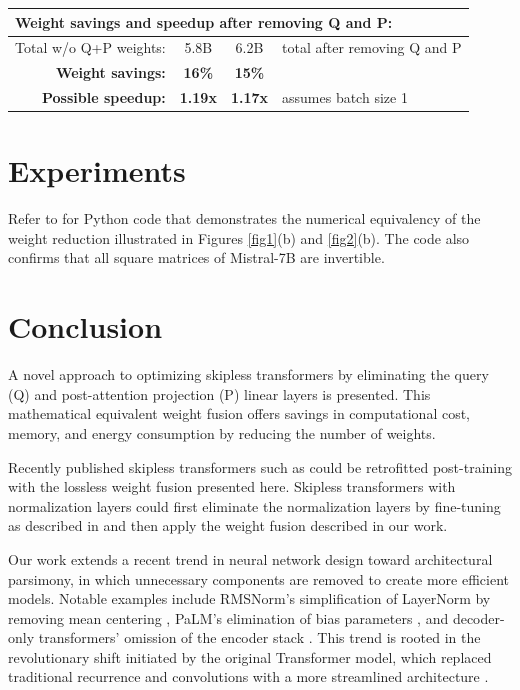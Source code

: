 \documentclass{article}
\begin{document}
\begin{center}
\begin{tabular}{lccl}
  \multicolumn{4}{l}{\textbf{Weight savings and speedup after removing Q and P:}}                           \\ \hline
  Total w/o Q+P weights:                           & 5.8B           & 6.2B   & total after removing Q and P \\
  \multicolumn{1}{r}{\textbf{Weight savings:}}     & \textbf{16\%}  & \textbf{15\%}  &                      \\
  \multicolumn{1}{r}{\textbf{Possible speedup:}}   & \textbf{1.19x} & \textbf{1.17x} & assumes batch size 1 \\ \hline
\end{tabular} \end{center}
\endgroup

\section{Experiments}
Refer to \cite{tricks} for Python code that demonstrates the numerical equivalency of the weight reduction illustrated in Figures \ref{fig1}(b) and \ref{fig2}(b). The code also confirms that all square matrices of Mistral-7B are invertible.

\section{Conclusion}
A novel approach to optimizing skipless transformers by eliminating the query (Q) and post-attention projection (P) linear layers is presented. This mathematical equivalent weight fusion offers savings in computational cost, memory, and energy consumption by reducing the number of weights.

Recently published skipless transformers such as \cite{skipless2, skipless} could be retrofitted post-training with the lossless weight fusion presented here. Skipless transformers with normalization layers could first eliminate the normalization layers by fine-tuning as described in \cite{remove-norm, remove-norm2} and then apply the weight fusion described in our work.

Our work extends a recent trend in neural network design toward architectural parsimony, in which unnecessary components are removed to create more efficient models. Notable examples include RMSNorm’s simplification of LayerNorm by removing mean centering \cite{rms}, PaLM’s elimination of bias parameters \cite{PaLM}, and decoder-only transformers’ omission of the encoder stack \cite{genWiki}. This trend is rooted in the revolutionary shift initiated by the original Transformer model, which replaced traditional recurrence and convolutions with a more streamlined architecture \cite{vanilla}.
\end{document}
